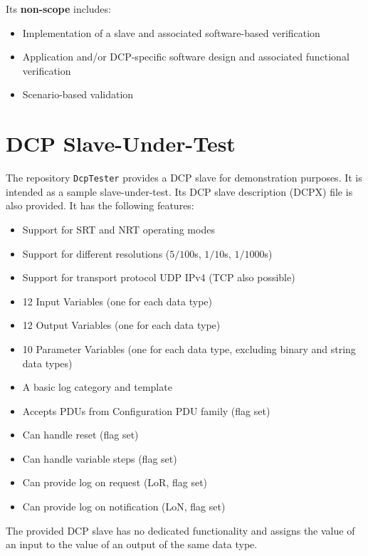 \documentclass[a4paper]{scrartcl}
\theoremstyle{definition}
\begin{document}
Its \textbf{non-scope} includes:
\begin{itemize}
	\item Implementation of a slave and associated software-based verification
	\item Application and/or DCP-specific software design and associated functional verification
	\item Scenario-based validation
\end{itemize}



\section{DCP Slave-Under-Test}
\label{sec:slave-under-test}
The repository \texttt{DcpTester} provides a DCP slave for demonstration purposes.
It is intended as a sample slave-under-test.
Its DCP slave description (DCPX) file is also provided.
It has the following features:

\begin{itemize}
	\item Support for SRT and NRT operating modes
	\item Support for different resolutions ($5/100$s, $1/10$s, $1/1000$s)
	\item Support for transport protocol UDP IPv4 (TCP also possible)
	\item 12 Input Variables (one for each data type)
	\item 12 Output Variables (one for each data type)
	\item 10 Parameter Variables (one for each data type, excluding binary and string data types)
	\item A basic log category and template
	\item Accepts PDUs from Configuration PDU family (flag set)
	\item Can handle reset (flag set)
	\item Can handle variable steps (flag set)
	\item Can provide log on request (LoR, flag set)
	\item Can provide log on notification (LoN, flag set)
\end{itemize}

The provided DCP slave has no dedicated functionality and assigns the value of an input to the value of an output of the same data type.
\end{document}
